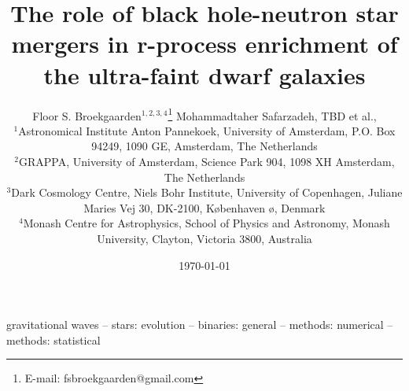 \documentclass[a4paper,fleqn,usenatbib,useAMS,usedcolumn]{mnras}
\title[]{The role of  black hole-neutron star mergers in r-process enrichment of the ultra-faint dwarf galaxies}
\author[]
{Floor S. Broekgaarden$^{1,2,3,4}$\thanks{E-mail: fsbroekgaarden@gmail.com }
Mohammadtaher Safarzadeh,  TBD et al.,
\\
$^{1}$Astronomical Institute Anton Pannekoek, University of Amsterdam, P.O. Box 94249, 1090 GE, Amsterdam, The Netherlands \\
$^{2}$GRAPPA, University of Amsterdam, Science Park 904, 1098 XH Amsterdam, The
Netherlands \\
$^{3}$Dark Cosmology Centre, Niels Bohr Institute, University of
Copenhagen, Juliane Maries Vej 30, DK-2100, K\o benhaven \o, Denmark \\
$^{4}$Monash Centre for Astrophysics, School of Physics and Astronomy, Monash University, Clayton, Victoria 3800, Australia
}
\date{\today}
\begin{document}
\normalem

\label{firstpage}
\pagerange{\pageref{firstpage}--\pageref{lastpage}}
\maketitle

\begin{abstract}
\end{abstract}


\begin{keywords}
gravitational waves --  stars: evolution -- binaries: general  -- methods: numerical -- methods: statistical 
\end{keywords}




\end{document}
